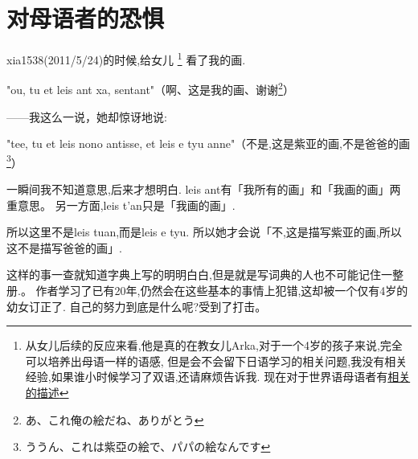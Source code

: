 \chapter{对母语者的恐惧}
xia1538(2011/5/24)的时候,给女儿
\footnote{从女儿后续的反应来看,他是真的在教女儿Arka,对于一个4岁的孩子来说,完全可以培养出母语一样的语感,
但是会不会留下日语学习的相关问题,我没有相关经验,如果谁小时候学习了双语,还请麻烦告诉我.
现在对于世界语母语者有\href{https://zhuanlan.zhihu.com/p/108359587}{相关的描述}}
看了我的画.

"ou, tu et leis ant xa, sentant"（啊、这是我的画、谢谢\footnote{あ、これ俺の絵だね、ありがとう}）

------我这么一说，她却惊讶地说:

"tee, tu et leis nono antisse, et leis e tyu anne"（不是,这是紫亚的画,不是爸爸的画\footnote{ううん、これは紫亞の絵で、パパの絵なんです}）

一瞬间我不知道意思,后来才想明白.
leis ant有「我所有的画」和「我画的画」两重意思。
另一方面,leis t'an只是「我画的画」.

所以这里不是leis tuan,而是leis e tyu.
所以她才会说「不,这是描写紫亚的画,所以这不是描写爸爸的画」.

这样的事一查就知道字典上写的明明白白,但是就是写词典的人也不可能记住一整册.。
作者学习了已有20年,仍然会在这些基本的事情上犯错,这却被一个仅有4岁的幼女订正了.
自己的努力到底是什么呢?受到了打击。